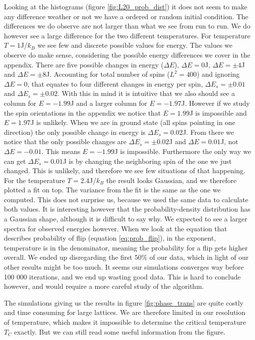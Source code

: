 \documentclass[reprint, english,notitlepage,nofootinbib]{revtex4-1}  %
\begin{document}
Looking at the histograms (figure \ref{fig:L20_prob_dist}) it does not seem to make any difference weather or not we have a ordered or random initial condition. The differences we do observe are not larger than what we see from run to run. We do however see a large difference for the two different temperatures. For temperature $T = 1$J/$k_B$ we see few and discrete possible values for energy. The values we observe do make sense, considering the possible energy differences we cover in the appendix. There are five possible changes in energy ($\Delta E$), $\Delta E = 0$J, $\Delta E = \pm 4$J and $\Delta E = \pm8$J. Accounting for total number of spins ($L^2 = 400$) and ignoring $\Delta E = 0$, that equates to four different changes in energy per spin, $\Delta E_s = \pm0.01$ and $\Delta E_s = \pm0.02$. With this in mind it is intuitive that we also should see a column for $E = -1.99$J and a larger column for $E = -1.97$J. However if we study the spin orientations in the appendix we notice that $E=1.99$J is impossible and $E = 1.97$J is unlikely. When we are in ground state (all spins pointing in one direction) the only possible change in energy is $\Delta E_s=0.02$J. From there we notice that the only possible changes are $\Delta E_s = \pm 0.02$J and $\Delta E = 0.01$J, not $\Delta E = -0.01$. This means $E = -1.99$J is impossible. Furthermore the only way we can get $\Delta E_s=0.01$J is by changing the neighboring spin of the one we just changed. This is unlikely, and therefore we see few situations of that happening. For the temperature $T = 2.4$J/$k_B$ the result looks Gaussian, and we therefore plotted a fit on top. The variance from the fit is the same as the one we computed. This does not surprise us, because we used the same data to calculate both values. It is interesting however that the probability-density distribution has a Gaussian shape, although it is difficult to say why. We expected to see a larger spectra for observed energies however. When we look at the equation that describes probability of flip (equation \eqref{eq:prob_flip}), in the exponent, temperature is in the denominator, meaning the probability for a flip gets higher overall. We ended up disregarding the first 50\% of our data, which in light of our other results might be too much. It seems our simulations converges way before 100 000 iterations, and we end up wasting good data. This is hard to conclude however, and would require a more careful study of the algorithm.

The simulations giving us the results in figure \ref{fig:phase_trans} are quite costly and time consuming for large lattices. We are therefore limited in our resolution of temperature, which makes it impossible to determine the critical temperature $T_C$ exactly. But we can still read some useful information from the figure.
\end{document}
